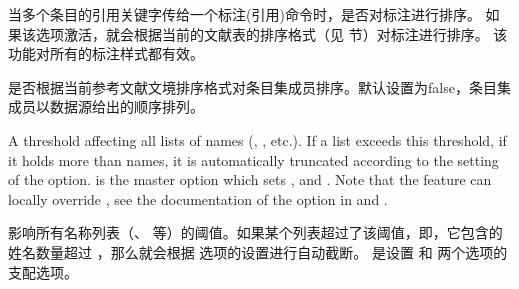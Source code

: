 \begin{optionlist}


当多个条目的引用关键字传给一个标注(引用)命令时，是否对标注进行排序。
如果该选项激活，就会根据当前的文献表的排序格式（见  节）对标注进行排序。
该功能对所有的标注样式都有效。


是否根据当前参考文献文境排序格式对条目集成员排序。默认设置为false，条目集成员以数据源给出的顺序排列。




A threshold affecting all lists of names (, , etc.). If a list exceeds this threshold, \ie if it holds more than  names, it is automatically truncated according to the setting of the  option.  is the master option which sets ,  and . Note that the  feature can locally override , see the documentation of the  option in  and .

影响所有名称列表（、 等）的阈值。如果某个列表超过了该阈值，即，它包含的姓名数量超过 ，那么就会根据  选项的设置进行自动截断。 是设置  和  两个选项的支配选项。




\end{optionlist}

